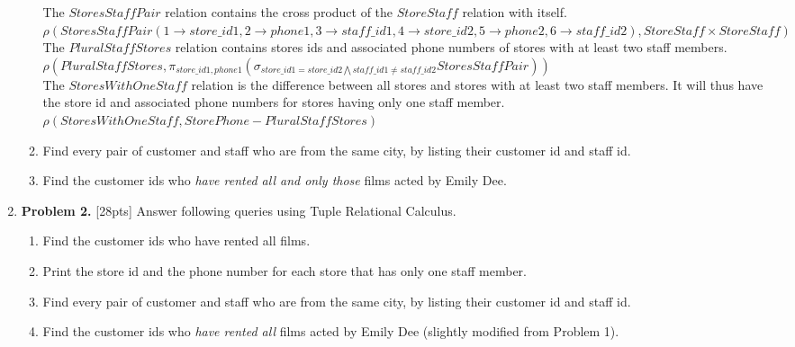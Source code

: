 \documentclass[paper=a4, fontsize=11pt]{scrartcl} %
\numberwithin{figure}{section} %
\numberwithin{table}{section} %
\begin{document}
\begin{enumerate}
\begin{enumerate}
The $StoresStaffPair$ relation contains the cross product of the $StoreStaff$ relation with itself.\\

$\rho(StoresStaffPair(1 \rightarrow store\_id1, 2 \rightarrow phone1, 3 \rightarrow staff\_id1, 4 \rightarrow store\_id2, 5 \rightarrow phone2, 6 \rightarrow staff\_id2), StoreStaff \times StoreStaff)$\\

The $PluralStaffStores$ relation contains stores ids and associated phone numbers of stores with at least two staff members.\\

$\rho(PluralStaffStores, \pi_{store\_id1, phone1} (\sigma_{store\_id1 = store\_id2 \bigwedge staff\_id1 \neq staff\_id2} StoresStaffPair))$\\

The $StoresWithOneStaff$ relation is the difference between all stores and stores with at least two staff members. It will thus have the store id and associated phone numbers for stores having only one staff member.\\

$\rho(StoresWithOneStaff, StorePhone - PluralStaffStores)$

\item Find every pair of customer and staff who are from the same city, by listing their customer id and staff id.

\item Find the customer ids who \textit{have rented all and only those} films acted by Emily Dee.
\end{enumerate}

\item \textbf{Problem 2.} [28pts] Answer following queries using Tuple Relational Calculus.

\begin{enumerate}

\item Find the customer ids who have rented all films.

\item Print the store id and the phone number for each store that has only one staff member.

\item Find every pair of customer and staff who are from the same city, by listing their customer id and staff id.

\item Find the customer ids who \textit{have rented all} films acted by Emily Dee (slightly modified from Problem 1).

\end{enumerate}

\end{enumerate}
\end{document}
